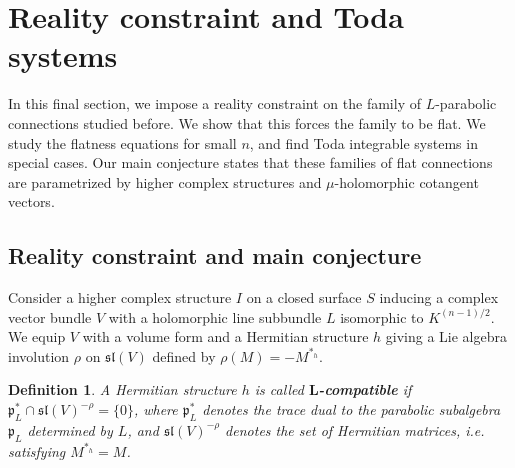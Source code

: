 \documentclass[11pt]{amsart}
\newtheorem{definition}[thm]{Definition}
\numberwithin{thm}{section} %
\numberwithin{equation}{section} %
\numberwithin{figure}{section} %
\begin{document}
\section{Reality constraint and Toda systems}\label{finalstep}

In this final section, we impose a reality constraint on the family of $L$-parabolic connections studied before. We show that this forces the family to be flat. We study the flatness equations for small $n$, and find Toda integrable systems in special cases. 
Our main conjecture states that these families of flat connections are parametrized by higher complex structures and $\mu$-holomorphic cotangent vectors.


\subsection{Reality constraint and main conjecture}

Consider a higher complex structure $I$ on a closed surface $S$ inducing a complex vector bundle $V$ with a holomorphic line subbundle $L$ isomorphic to $K^{(n-1)/2}$. We equip $V$ with a volume form and a Hermitian structure $h$ giving a Lie algebra involution $\rho$ on $\mathfrak{sl}(V)$ defined by $\rho(M)=-M^{*_h}$.

\begin{definition}
    A Hermitian structure $h$ is called $\mathbf{L}$\textbf{-compatible} if $\mathfrak{p}_L^*\cap\mathfrak{sl}(V)^{-\rho}=\{0\}$, where $\mathfrak{p}_L^*$ denotes the trace dual to the parabolic subalgebra $\mathfrak{p}_L$ determined by $L$, and $\mathfrak{sl}(V)^{-\rho}$ denotes the set of Hermitian matrices, i.e. satisfying $M^{*_h}=M$.
\end{definition}
\end{document}
